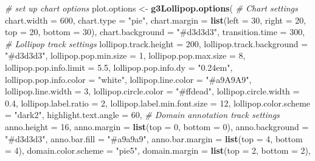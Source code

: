\documentclass[
]{article}
\newenvironment{Shaded}{\begin{snugshade}}{\end{snugshade}}
\newcommand{\AttributeTok}[1]{\textcolor[rgb]{0.13,0.29,0.53}{#1}}
\newcommand{\CommentTok}[1]{\textcolor[rgb]{0.56,0.35,0.01}{\textit{#1}}}
\newcommand{\DecValTok}[1]{\textcolor[rgb]{0.00,0.00,0.81}{#1}}
\newcommand{\FloatTok}[1]{\textcolor[rgb]{0.00,0.00,0.81}{#1}}
\newcommand{\FunctionTok}[1]{\textcolor[rgb]{0.13,0.29,0.53}{\textbf{#1}}}
\newcommand{\NormalTok}[1]{#1}
\newcommand{\OtherTok}[1]{\textcolor[rgb]{0.56,0.35,0.01}{#1}}
\newcommand{\StringTok}[1]{\textcolor[rgb]{0.31,0.60,0.02}{#1}}
\begin{document}
\begin{Shaded}
\begin{Highlighting}[]
\CommentTok{\# set up chart options}
\NormalTok{plot.options }\OtherTok{\textless{}{-}} \FunctionTok{g3Lollipop.options}\NormalTok{(}
  \CommentTok{\# Chart settings}
  \AttributeTok{chart.width =} \DecValTok{600}\NormalTok{,}
  \AttributeTok{chart.type =} \StringTok{"pie"}\NormalTok{,}
  \AttributeTok{chart.margin =} \FunctionTok{list}\NormalTok{(}\AttributeTok{left =} \DecValTok{30}\NormalTok{, }\AttributeTok{right =} \DecValTok{20}\NormalTok{, }\AttributeTok{top =} \DecValTok{20}\NormalTok{, }\AttributeTok{bottom =} \DecValTok{30}\NormalTok{),}
  \AttributeTok{chart.background =} \StringTok{"\#d3d3d3"}\NormalTok{,}
  \AttributeTok{transition.time =} \DecValTok{300}\NormalTok{,}
  \CommentTok{\# Lollipop track settings}
  \AttributeTok{lollipop.track.height =} \DecValTok{200}\NormalTok{,}
  \AttributeTok{lollipop.track.background =} \StringTok{"\#d3d3d3"}\NormalTok{,}
  \AttributeTok{lollipop.pop.min.size =} \DecValTok{1}\NormalTok{,}
  \AttributeTok{lollipop.pop.max.size =} \DecValTok{8}\NormalTok{,}
  \AttributeTok{lollipop.pop.info.limit =} \FloatTok{5.5}\NormalTok{,}
  \AttributeTok{lollipop.pop.info.dy =} \StringTok{"0.24em"}\NormalTok{,}
  \AttributeTok{lollipop.pop.info.color =} \StringTok{"white"}\NormalTok{,}
  \AttributeTok{lollipop.line.color =} \StringTok{"\#a9A9A9"}\NormalTok{,}
  \AttributeTok{lollipop.line.width =} \DecValTok{3}\NormalTok{,}
  \AttributeTok{lollipop.circle.color =} \StringTok{"\#ffdead"}\NormalTok{,}
  \AttributeTok{lollipop.circle.width =} \FloatTok{0.4}\NormalTok{,}
  \AttributeTok{lollipop.label.ratio =} \DecValTok{2}\NormalTok{,}
  \AttributeTok{lollipop.label.min.font.size =} \DecValTok{12}\NormalTok{,}
  \AttributeTok{lollipop.color.scheme =} \StringTok{"dark2"}\NormalTok{,}
  \AttributeTok{highlight.text.angle =} \DecValTok{60}\NormalTok{,}
  \CommentTok{\# Domain annotation track settings}
  \AttributeTok{anno.height =} \DecValTok{16}\NormalTok{,}
  \AttributeTok{anno.margin =} \FunctionTok{list}\NormalTok{(}\AttributeTok{top =} \DecValTok{0}\NormalTok{, }\AttributeTok{bottom =} \DecValTok{0}\NormalTok{),}
  \AttributeTok{anno.background =} \StringTok{"\#d3d3d3"}\NormalTok{,}
  \AttributeTok{anno.bar.fill =} \StringTok{"\#a9a9a9"}\NormalTok{,}
  \AttributeTok{anno.bar.margin =} \FunctionTok{list}\NormalTok{(}\AttributeTok{top =} \DecValTok{4}\NormalTok{, }\AttributeTok{bottom =} \DecValTok{4}\NormalTok{),}
  \AttributeTok{domain.color.scheme =} \StringTok{"pie5"}\NormalTok{,}
  \AttributeTok{domain.margin =} \FunctionTok{list}\NormalTok{(}\AttributeTok{top =} \DecValTok{2}\NormalTok{, }\AttributeTok{bottom =} \DecValTok{2}\NormalTok{),}

\end{Highlighting}
\end{Shaded}
\end{document}
